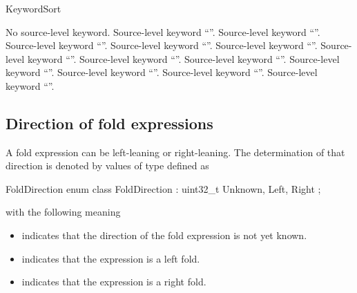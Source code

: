 \subsubsection{}
\label{sec:ifc:KeywordSort}


\begin{SortEnum}{KeywordSort}
\end{SortEnum}

 No source-level keyword.
 Source-level keyword ``''.
 Source-level keyword ``''.
 Source-level keyword ``''.
 Source-level keyword ``''.
 Source-level keyword ``''.
 Source-level keyword ``''.
 Source-level keyword ``''.
 Source-level keyword ``''.
 Source-level keyword ``''.
 Source-level keyword ``''.
 Source-level keyword ``''.
 Source-level keyword ``''.

\subsection{Direction of fold expressions}
\label{sec:ifc:syntax-fold-direction}

A fold expression can be left-leaning or right-leaning.  The determination 
of that direction is denoted by values of type  defined as
\begin{typedef}{FoldDirection}{}
	enum class FoldDirection : uint32_t {
		Unknown,
		Left,
		Right
	};
\end{typedef}
with the following meaning
\begin{itemize}
	\item {} indicates that the direction of the fold expression is not yet known.
	\item {} indicates that the expression is a left fold.
	\item {} indicates that the expression is a right fold.
\end{itemize}

